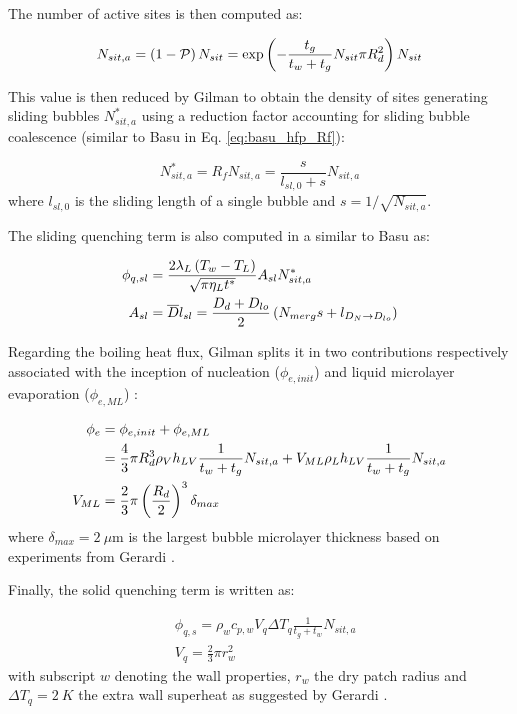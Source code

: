 The number of active sites is then computed as:

\begin{equation}
N_{sit,a} = \left( 1-\mathcal{P} \right)N_{sit} = \mathrm{exp}\left( -\dfrac{t_{g}}{t_{w}+t_{g}}N_{sit}\pi R_{d}^{2} \right) N_{sit}
\label{eq:gilman_hfp_nsita}
\end{equation}

This value is then reduced by Gilman to obtain the density of sites generating sliding bubbles $N_{sit,a}^{*}$ using a reduction factor accounting for sliding bubble coalescence (similar to Basu \etal in Eq. \ref{eq:basu_hfp_Rf}):

\begin{equation}
N_{sit,a}^{*}=R_{f}N_{sit,a} = \frac{s}{l_{sl,0}+s} N_{sit,a}
\end{equation}
where $l_{sl,0}$ is the sliding length of a single bubble and $s=1/\sqrt{N_{sit,a}}$.


The sliding quenching term is also computed in a similar to Basu \etal as:

\begin{align}
\phi_{q,sl}&=\frac{2\lambda_{L}\parth{T_{w}-T_{L}}}{\sqrt{\pi \eta_{L}t^{*}}}A_{sl}N_{sit,a}^{*}
\label{eq:gilman_hfp_phiq} \\
%
A_{sl} &= \overline{D}l_{sl} = \frac{D_{d}+D_{lo}}{2}\parth{N_{merg}s+l_{D_{N}\rightarrow D_{lo}}}
\end{align}

Regarding the boiling heat flux, Gilman splits it in two contributions respectively associated with the inception of nucleation ($\phi_{e,init}$) and liquid microlayer evaporation ($\phi_{e,ML}$) :

\begin{align}
\phi_{e} &= \phi_{e,init} + \phi_{e,ML} \\
%
&= \frac{4}{3}\pi R_{d}^{3}\rho_{V} h_{LV} \frac{1}{t_{w}+t_{g}}N_{sit,a} + V_{ML} \rho_{L}h_{LV} \frac{1}{t_{w}+t_{g}}N_{sit,a}\\
%
V_{ML} &= \frac{2}{3}\pi \parth{\frac{R_{d}}{2}}^{3}\delta_{max}
\end{align}
where $\delta_{max}=2\ \mu\text{m}$ is the largest bubble microlayer thickness based on experiments from Gerardi \cite{gerardi}.

\npar

Finally, the solid quenching term is written as:

\begin{align}
& \phi_{q,s} = \rho_{w} c_{p,w} V_{q} \Delta T_{q} \frac{1}{t_{g}+t_{w}} N_{sit,a}\\
%
& V_{q} = \frac{2}{3} \pi r_{w}^{2}
\end{align}
with subscript $w$ denoting the wall properties, $r_{w}$ the dry patch radius and $\Delta T_{q}=2\ K$ the extra wall superheat as suggested by Gerardi \etal \cite{gerardi_etal}.

